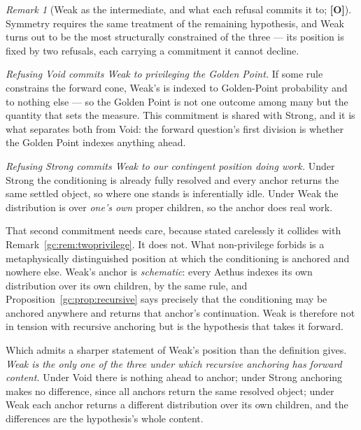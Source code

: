 \documentclass[11pt]{article}
\numberwithin{equation}{section}
\theoremstyle{plain}
\theoremstyle{definition}
\theoremstyle{remark}
\newtheorem{remark}[theorem]{Remark}
\begin{document}
\begin{remark}[Weak as the intermediate, and what each refusal commits
it to; \textbf{[O]}]\label{gc:rem:weakposition}
Symmetry requires the same treatment of the remaining hypothesis, and
Weak turns out to be the most structurally constrained of the three ---
its position is fixed by two refusals, each carrying a commitment it
cannot decline.

\emph{Refusing Void commits Weak to privileging the Golden Point.} If
some rule constrains the forward cone, Weak's is indexed to
Golden-Point probability and to nothing else --- so the Golden Point is
not one outcome among many but the quantity that sets the measure. This
commitment is shared with Strong, and it is what separates both from
Void: the forward question's first division is whether the Golden Point
indexes anything ahead.

\emph{Refusing Strong commits Weak to our contingent position doing
work.} Under Strong the conditioning is already fully resolved and every
anchor returns the same settled object, so where one stands is
inferentially idle. Under Weak the distribution is over \emph{one's own}
proper children, so the anchor does real work.

That second commitment needs care, because stated carelessly it collides
with Remark~\ref{gc:rem:twoprivilege}. It does not. What non-privilege
forbids is a metaphysically distinguished position at which the
conditioning is anchored and nowhere else. Weak's anchor is
\emph{schematic}: every Aethus indexes its own distribution over its own
children, by the same rule, and Proposition~\ref{gc:prop:recursive} says
precisely that the conditioning may be anchored anywhere and returns
that anchor's continuation. Weak is therefore not in tension with
recursive anchoring but is the hypothesis that takes it forward.

Which admits a sharper statement of Weak's position than the definition
gives. \emph{Weak is the only one of the three under which recursive
anchoring has forward content.} Under Void there is nothing ahead to
anchor; under Strong anchoring makes no difference, since all anchors
return the same resolved object; under Weak each anchor returns a
different distribution over its own children, and the differences are
the hypothesis's whole content.


\end{remark}
\end{document}
